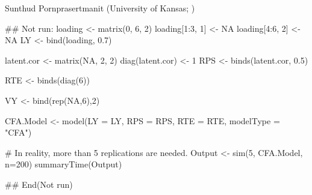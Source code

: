\documentclass[a4paper]{book}
\begin{document}
%
\begin{Author}\relax
Sunthud Pornprasertmanit (University of Kansas; )
\end{Author}
%
\begin{Examples}
\begin{ExampleCode}
## Not run: 
loading <- matrix(0, 6, 2)
loading[1:3, 1] <- NA
loading[4:6, 2] <- NA
LY <- bind(loading, 0.7)

latent.cor <- matrix(NA, 2, 2)
diag(latent.cor) <- 1
RPS <- binds(latent.cor, 0.5)

RTE <- binds(diag(6))

VY <- bind(rep(NA,6),2)

CFA.Model <- model(LY = LY, RPS = RPS, RTE = RTE, modelType = "CFA")

# In reality, more than 5 replications are needed.
Output <- sim(5, CFA.Model, n=200)
summaryTime(Output)

## End(Not run)
\end{ExampleCode}
\end{Examples}
\printindex{}
\end{document}
